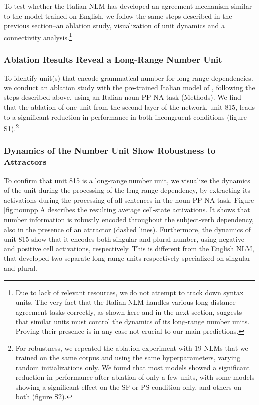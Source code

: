 To test whether the Italian NLM has developed an agreement mechanism similar to the model trained on English, we follow the same steps described in the previous section--an ablation study, visualization of unit dynamics and a connectivity analysis.\footnote{Due to lack of relevant resources, we do not attempt to track down syntax units. The very fact that the Italian NLM handles various long-distance agreement tasks correctly, as shown here and in the next section, suggests that similar units must control the dynamics of its long-range number units. Proving their presence is in any case not crucial to our main predictions.}

\subsubsection{Ablation Results Reveal a Long-Range Number Unit} To identify unit(s) that encode grammatical number for long-range dependencies, we conduct an ablation study with the pre-trained Italian model of \citet{Gulordava:etal:2018}, following the steps described above, using an Italian noun-PP NA-task (Methods). 
We find that the ablation of one unit from the second layer of the network, unit 815, leads to a significant reduction in performance in both incongruent conditions (figure S1).\footnote{For robustness, we repeated the ablation experiment with 19 NLMs that we trained on the same corpus and using the same hyperparameters, varying random initializations only. We found that most models showed a significant reduction in performance after ablation of only a few units, with some models showing a significant effect on the SP or PS condition only, and others on both (figure S2).}

\subsubsection{Dynamics of the Number Unit Show Robustness to Attractors} 
To confirm that unit 815 is a long-range number unit, we visualize the dynamics of the unit during the processing of the long-range dependency, by extracting its activations during the processing of all sentences in the noun-PP NA-task. Figure \ref{fig:nounpp}A describes the resulting average cell-state activations. It shows that number information is robustly encoded throughout the subject-verb dependency, also in the presence of an attractor (dashed lines). Furthermore, the dynamics of unit 815 show that it encodes both singular and plural number, using negative and positive cell activations, respectively. This is different from the English NLM, that developed two separate long-range units respectively specialized on singular and plural.

